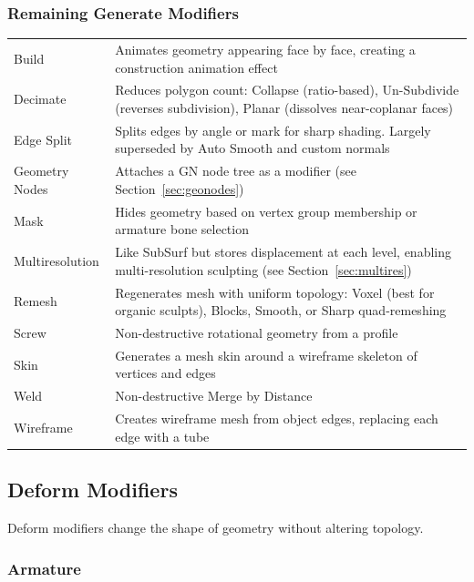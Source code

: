 \subsubsection{Remaining Generate Modifiers}

\begin{center}
\begin{tabularx}{\textwidth}{L{3.5cm}X}
\toprule
{}
 &  \\
\midrule
Build & Animates geometry appearing face by face, creating a construction animation effect \\
Decimate & Reduces polygon count: Collapse (ratio-based), Un-Subdivide (reverses subdivision), Planar (dissolves near-coplanar faces) \\
Edge Split & Splits edges by angle or mark for sharp shading. Largely superseded by Auto Smooth and custom normals \\
Geometry Nodes & Attaches a GN node tree as a modifier (see Section~\ref{sec:geonodes}) \\
Mask & Hides geometry based on vertex group membership or armature bone selection \\
Multiresolution & Like SubSurf but stores displacement at each level, enabling multi-resolution sculpting (see Section~\ref{sec:multires}) \\
Remesh & Regenerates mesh with uniform topology: Voxel (best for organic sculpts), Blocks, Smooth, or Sharp quad-remeshing \\
Screw & Non-destructive rotational geometry from a profile \\
Skin & Generates a mesh skin around a wireframe skeleton of vertices and edges \\
Weld & Non-destructive Merge by Distance \\
Wireframe & Creates wireframe mesh from object edges, replacing each edge with a tube \\
\bottomrule
\end{tabularx}
\end{center}

\subsection{Deform Modifiers}
\label{sec:deformmod}

Deform modifiers change the shape of geometry without altering topology.

\subsubsection{Armature}

